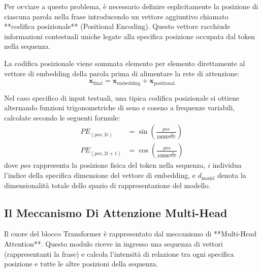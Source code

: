 ﻿\documentclass[11pt, a4paper]{article}
\begin{document}

Per ovviare a questo problema, è necessario definire esplicitamente la posizione di ciascuna parola nella frase introducendo un vettore aggiuntivo chiamato **codifica posizionale** (Positional Encoding). Questo vettore racchiude informazioni contestuali uniche legate alla specifica posizione occupata dal token nella sequenza.


La codifica posizionale viene sommata elemento per elemento direttamente al vettore di embedding della parola prima di alimentare la rete di attenzione:
\[
\bm{x}_{\text{final}} = \bm{x}_{\text{embedding}} + \bm{x}_{\text{positional}}
\]

Nel caso specifico di input testuali, una tipica codifica posizionale si ottiene alternando funzioni trigonometriche di seno e coseno a frequenze variabili, calcolate secondo le seguenti formule:
\begin{align*}
PE_{(pos, 2i)} &= \sin\left(\frac{pos}{10000^{\frac{2i}{d_{\text{model}}}}}\right) \\
PE_{(pos, 2i+1)} &= \cos\left(\frac{pos}{10000^{\frac{2i}{d_{\text{model}}}}}\right)
\end{align*}
dove $pos$ rappresenta la posizione fisica del token nella sequenza, $i$ individua l'indice della specifica dimensione del vettore di embedding, e $d_{\text{model}}$ denota la dimensionalità totale dello spazio di rappresentazione del modello.

\subsection{Il Meccanismo Di Attenzione Multi-Head}

Il cuore del blocco Transformer è rappresentato dal meccanismo di **Multi-Head Attention**. Questo modulo riceve in ingresso una sequenza di vettori (rappresentanti la frase) e calcola l'intensità di relazione tra ogni specifica posizione e tutte le altre posizioni della sequenza.

\end{document}
